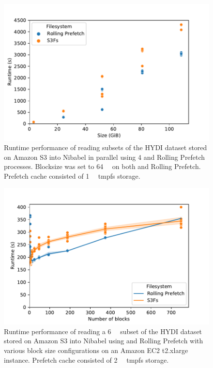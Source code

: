 \documentclass[conference]{IEEEtran}
\begin{document}
\begin{figure}
\begin{center}
\includegraphics[width=\columnwidth]{figures/parallel.pdf}
\setlength{\abovecaptionskip}{-10pt}
\setlength{\belowcaptionskip}{-10pt}
\caption{Runtime performance of reading subsets of the HYDI dataset stored on Amazon S3 into Nibabel in parallel using 4
\sfs and Rolling Prefetch processes. Blocksize was set to \SI{64}{\mebi\byte} on both \sfs and Rolling Prefetch.
Prefetch cache consisted of \SI{1}{\gibi\byte} tmpfs storage.}
\label{fig:parallel}
\end{center}
\end{figure}

\begin{figure}
\begin{center}
\includegraphics[width=\columnwidth]{figures/blocksize.pdf}
\setlength{\abovecaptionskip}{-10pt}
 \setlength{\belowcaptionskip}{-20pt}
\caption{Runtime performance of reading a \SI{6}{\gibi\byte} subset of the HYDI dataset stored on Amazon S3 into Nibabel using
\sfs and Rolling Prefetch with various block size configurations on an Amazon EC2 t2.xlarge instance. Prefetch cache consisted of  \SI{2}{\gibi\byte} tmpfs storage.}
\label{fig:blocksize}
\end{center}
\end{figure}
\end{document}
